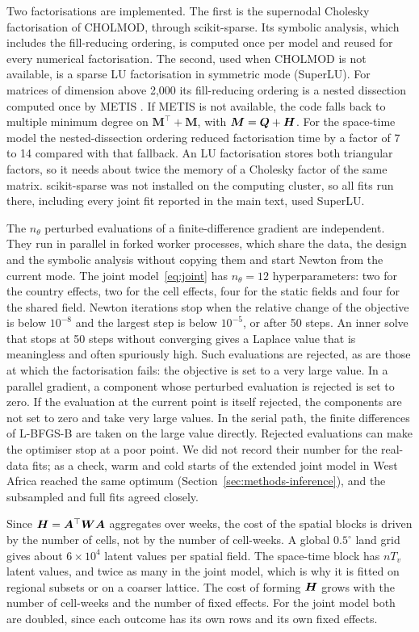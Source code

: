 Two factorisations are implemented. The first is the supernodal Cholesky
factorisation of CHOLMOD, through scikit-sparse. Its symbolic analysis, which includes
the fill-reducing ordering, is computed once per model and reused for every numerical
factorisation. The second, used when CHOLMOD is not available, is a sparse LU
factorisation in symmetric mode (SuperLU). For matrices of dimension above 2{,}000
its fill-reducing ordering is a nested dissection computed once by METIS
\citep{karypis1998metis}. If METIS is not available, the code falls back to multiple
minimum degree on $\bm{M}^\top + \bm{M}$, with $\bm{M} = \bm{Q} + \bm{H}$. For the space-time model the nested-dissection
ordering reduced factorisation time by a factor of 7 to 14 compared with that
fallback. An LU factorisation stores both triangular factors, so it needs about twice
the memory of a Cholesky factor of the same matrix. scikit-sparse was not installed on
the computing cluster, so all fits run there, including every joint fit reported in
the main text, used SuperLU.

The $n_\theta$ perturbed evaluations of a finite-difference gradient are independent.
They run in parallel in forked worker processes, which share the data, the design and
the symbolic analysis without copying them and start Newton from the current mode.
The joint model~\eqref{eq:joint} has $n_\theta = 12$ hyperparameters: two for the
country effects, two for the cell effects, four for the static fields and four for
the shared field. Newton iterations stop when the relative change of the objective is
below $10^{-8}$ and the largest step is below $10^{-5}$, or after 50 steps. An inner
solve that stops at 50 steps without converging gives a Laplace value that is
meaningless and often spuriously high. Such evaluations are rejected, as are those at
which the factorisation fails: the objective is set to a very large value. In a
parallel gradient, a component whose perturbed evaluation is rejected is set to zero.
If the evaluation at the current point is itself rejected, the components are not set
to zero and take very large values. In the serial path, the finite differences of
L-BFGS-B are taken on the large value directly. Rejected evaluations can make the
optimiser stop at a poor point. We did not record their number for the real-data
fits; as a check, warm and cold starts of the extended joint model in West Africa
reached the same optimum (Section~\ref{sec:methods-inference}), and the subsampled
and full fits agreed closely.

Since $\bm{H} = \bm{A}^\top\bm{W}\bm{A}$ aggregates over weeks, the cost of the spatial
blocks is driven by the number of cells, not by the number of cell-weeks. A global
$0.5^\circ$ land grid gives about $6\times10^4$ latent values per spatial field. The
space-time block has $nT_v$ latent values, and twice as many in the joint model,
which is why it is fitted on regional subsets or on a coarser lattice. The cost of
forming $\bm{H}$ grows with the number of cell-weeks and the number of fixed effects. For
the joint model both are doubled, since each outcome has its own rows and its own
fixed effects.


